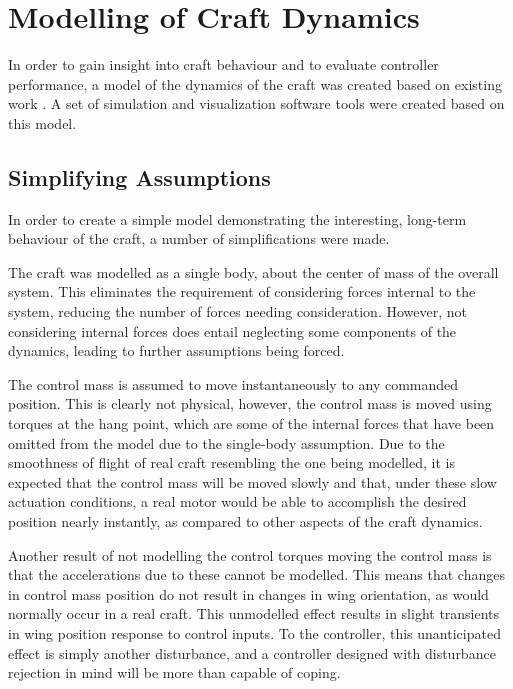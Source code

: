 \documentclass{sydeStyle}
\begin{document}
\section{Modelling of Craft Dynamics}
\label{sec:modelling}

In order to gain insight into craft behaviour and to evaluate controller
performance, a model of the dynamics of the craft was created based on existing
work \cite{Rogallo1960}\cite{Layton1963}\cite{spottiswoode}. A set of simulation
and visualization software tools were created based on this model.

\subsection{Simplifying Assumptions}

In order to create a simple model demonstrating the interesting, long-term
behaviour of the craft, a number of simplifications were made.

The craft was modelled as a single body, about the center of mass of the overall
system. This eliminates the requirement of considering forces internal to the
system, reducing the number of forces needing consideration. However, not
considering internal forces does entail neglecting some components of the
dynamics, leading to further assumptions being forced.

The control mass is assumed to move instantaneously to any commanded position.
This is clearly not physical, however, the control mass is moved using torques
at the hang point, which are some of the internal forces that have been omitted
from the model due to the single-body assumption. Due to the smoothness of
flight of real craft resembling the one being modelled, it is expected that the
control mass will be moved slowly and that, under these slow actuation
conditions, a real motor would be able to accomplish the desired position
nearly instantly, as compared to other aspects of the craft dynamics.

Another result of not modelling the control torques moving the control mass is
that the accelerations due to these cannot be modelled. This means that changes in
control mass position do not result in changes in wing orientation, as would
normally occur in a real craft. This unmodelled effect results in slight
transients in wing position response to control inputs. To the controller, this
unanticipated effect is simply another disturbance, and a controller designed
with disturbance rejection in mind will be more than capable of coping.
\end{document}

